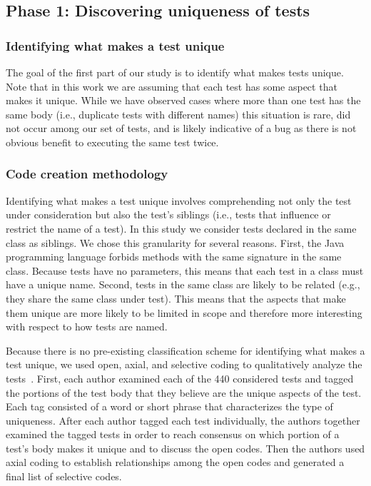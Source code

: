 \documentclass[proposal.tex]{subfiles}
\begin{document}
\subsection{Phase 1: Discovering uniqueness of tests}

\subsubsection{Identifying what makes a test unique}

The goal of the first part of our study is to identify what makes tests unique.
%
Note that in this work we are assuming that each test has some aspect that makes it unique.
%
While we have observed cases where more than one test has the same body (i.e., duplicate tests with different names) this situation is rare, did not occur among our set of tests, and is likely indicative of a bug as there is not obvious benefit to executing the same test twice.

\subsubsection{Code creation methodology}

Identifying what makes a test unique involves comprehending not only the test under consideration but also the test’s siblings (i.e., tests that influence or restrict the name of a test).
%
In this study we consider tests declared in the same class as siblings. We chose this granularity for several reasons.
%
First, the Java programming language forbids methods with the same signature in the same class.
%
Because tests have no parameters, this means that each test in a class must have a unique name.
%
Second, tests in the same class are likely to be related (e.g., they share the same class under test).
%
This means that the aspects that make them unique are more likely to be limited in scope and therefore more interesting with respect to how tests are named.

Because there is no pre-existing classification scheme for identifying what makes a test unique, we used open, axial, and selective coding to qualitatively analyze the tests~\cite{glaser1967discovery,strauss1998basics}.
%
First, each author examined each of the \num{440} considered tests and tagged the portions of the test body that they believe are the unique aspects of the test.
%
Each tag consisted of a word or short phrase that characterizes the type of uniqueness.
%
After each author tagged each test individually, the authors together examined the tagged tests in order to reach consensus on which portion of a test’s body makes it unique and to discuss the open codes.
%
Then the authors used axial coding to establish relationships among the open codes and generated a final list of selective codes.
\end{document}
